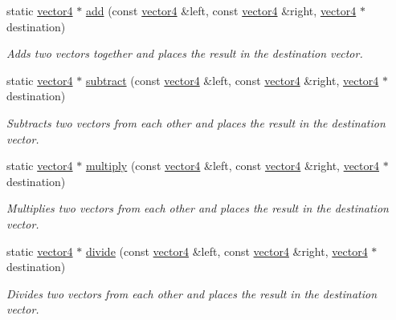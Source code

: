 \begin{DoxyCompactItemize}
\item 
static \hyperlink{classflounder_1_1vector4}{vector4} $\ast$ \hyperlink{classflounder_1_1vector4_a2171bb079fe5452b29bf8e8cfda37cfc}{add} (const \hyperlink{classflounder_1_1vector4}{vector4} \&left, const \hyperlink{classflounder_1_1vector4}{vector4} \&right, \hyperlink{classflounder_1_1vector4}{vector4} $\ast$destination)
\begin{DoxyCompactList}\small\item\em Adds two vectors together and places the result in the destination vector. \end{DoxyCompactList}\item 
static \hyperlink{classflounder_1_1vector4}{vector4} $\ast$ \hyperlink{classflounder_1_1vector4_ace85efb2fa107a044262f171c710d0aa}{subtract} (const \hyperlink{classflounder_1_1vector4}{vector4} \&left, const \hyperlink{classflounder_1_1vector4}{vector4} \&right, \hyperlink{classflounder_1_1vector4}{vector4} $\ast$destination)
\begin{DoxyCompactList}\small\item\em Subtracts two vectors from each other and places the result in the destination vector. \end{DoxyCompactList}\item 
static \hyperlink{classflounder_1_1vector4}{vector4} $\ast$ \hyperlink{classflounder_1_1vector4_ab19ea20a89c5c50ef7220a082ba99e85}{multiply} (const \hyperlink{classflounder_1_1vector4}{vector4} \&left, const \hyperlink{classflounder_1_1vector4}{vector4} \&right, \hyperlink{classflounder_1_1vector4}{vector4} $\ast$destination)
\begin{DoxyCompactList}\small\item\em Multiplies two vectors from each other and places the result in the destination vector. \end{DoxyCompactList}\item 
static \hyperlink{classflounder_1_1vector4}{vector4} $\ast$ \hyperlink{classflounder_1_1vector4_a6b1441973022af2df2de1aa886c9f370}{divide} (const \hyperlink{classflounder_1_1vector4}{vector4} \&left, const \hyperlink{classflounder_1_1vector4}{vector4} \&right, \hyperlink{classflounder_1_1vector4}{vector4} $\ast$destination)
\begin{DoxyCompactList}\small\item\em Divides two vectors from each other and places the result in the destination vector. \end{DoxyCompactList}\item 

\end{DoxyCompactItemize}
